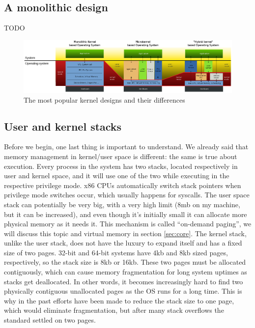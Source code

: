 \documentclass[10pt]{book}
\begin{document}
\subsection{A monolithic design}
TODO

\begin{figure}[ht]
\includegraphics[width=25cm, keepaspectratio]{images/monolithic.png}
\caption{The most popular kernel designs and their differences}
\label{img:monolithic}
\end{figure}

\subsection{User and kernel stacks} Before we begin, one last thing is important to understand. We already said that memory management in kernel/user space is different: the same is true about execution. Every process in the system has two stacks, located respectively in user and kernel space, and it will use one of the two while executing in the respective privilege mode. x86 CPUs automatically switch stack pointers when privilege mode switches occur, which usually happens for syscalls. The user space stack can potentially be very big, with a very high limit (8mb on my machine, but it can be increased), and even though it's initially small it can allocate more physical memory as it needs it. This mechanism is called ``on-demand paging'', we will discuss this topic and virtual memory in section \ref{sec:core}. The kernel stack, unlike the user stack, does not have the luxury to expand itself and has a fixed size of two pages. 32-bit and 64-bit systems have 4kb and 8kb sized pages, respectively, so the stack size is 8kb or 16kb. These two pages must be allocated contiguously, which can cause memory fragmentation for long system uptimes as stacks get deallocated. In other words, it becomes increasingly hard to find two physically contiguous unallocated pages as the OS runs for a long time. This is why in the past efforts have been made to reduce the stack size to one page, which would eliminate fragmentation, but after many stack overflows the standard settled on two pages. 
\end{document}
